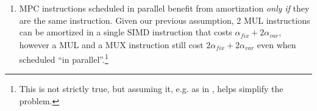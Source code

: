 \begin{enumerate}
\item MPC instructions scheduled in parallel benefit from amortization \emph{only if} they are the same instruction. Given our previous assumption,
2 MUL instructions can be amortized in a single SIMD instruction that costs $\alpha_\mathit{fix} + 2\alpha_\mathit{var}$, however a MUL and a MUX instruction
still cost $2\alpha_\mathit{fix} + 2\alpha_\mathit{var}$ even when scheduled ``in parallel''.\footnote{This is not strictly true, but assuming it, e.g. as in 
\cite{Ishaq:2019, NDSS:DemSchZoh15, Mohassel:2018}, helps simplify the problem.}
\end{enumerate}


